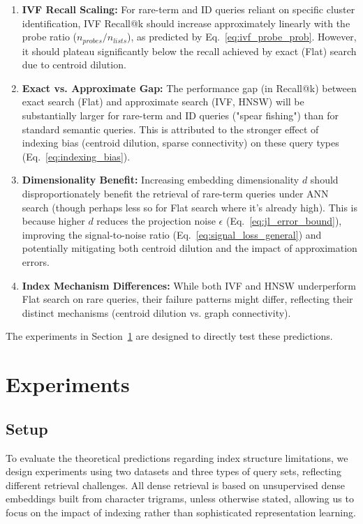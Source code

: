 \documentclass[manuscript]{acmart}
\begin{document}
\begin{enumerate}
    \item \textbf{IVF Recall Scaling:} For rare-term and ID queries reliant on specific cluster identification, IVF Recall@k should increase approximately linearly with the probe ratio ($n_{probes}/n_{lists}$), as predicted by Eq.~\ref{eq:ivf_probe_prob}. However, it should plateau significantly below the recall achieved by exact (Flat) search due to centroid dilution.
    \item \textbf{Exact vs. Approximate Gap:} The performance gap (in Recall@k) between exact search (Flat) and approximate search (IVF, HNSW) will be substantially larger for rare-term and ID queries ("spear fishing") than for standard semantic queries. This is attributed to the stronger effect of indexing bias (centroid dilution, sparse connectivity) on these query types (Eq.~\ref{eq:indexing_bias}).
    \item \textbf{Dimensionality Benefit:} Increasing embedding dimensionality $d$ should disproportionately benefit the retrieval of rare-term queries under ANN search (though perhaps less so for Flat search where it's already high). This is because higher $d$ reduces the projection noise $\epsilon$ (Eq.~\ref{eq:jl_error_bound}), improving the signal-to-noise ratio (Eq.~\ref{eq:signal_loss_general}) and potentially mitigating both centroid dilution and the impact of approximation errors.
    \item \textbf{Index Mechanism Differences:} While both IVF and HNSW underperform Flat search on rare queries, their failure patterns might differ, reflecting their distinct mechanisms (centroid dilution vs. graph connectivity).
\end{enumerate}

The experiments in Section~\ref{sec:experiments} are designed to directly test these predictions.

\section{Experiments}\label{sec:experiments}

\subsection{Setup}

To evaluate the theoretical predictions regarding index structure limitations, we design experiments using two datasets and three types of query sets, reflecting different retrieval challenges. All dense retrieval is based on unsupervised dense embeddings built from character trigrams, unless otherwise stated, allowing us to focus on the impact of indexing rather than sophisticated representation learning.
\end{document}
